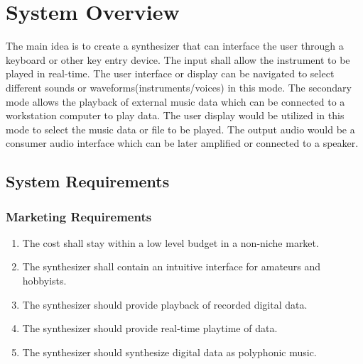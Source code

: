 \documentclass[bibtotocnumbered,abstract=on,paper=a4,fontsize=12pt,parskip=on,halfparskip=on]{scrartcl}		%
\begin{document}
\section{System Overview}
The main idea is to create a synthesizer that can interface the user through a keyboard or other key entry device. The input shall allow the instrument to be played in real-time. The user interface or display can be navigated to select different sounds or waveforms(instruments/voices) in this mode. The secondary mode allows the playback of external music data which can be connected to a workstation computer to play data. The user display would be utilized in this mode to select the music data or file to be played. The output audio would be a consumer audio interface which can be later amplified or connected to a speaker.

  \subsection{System Requirements}
    \subsubsection{Marketing Requirements}
      \begin{enumerate}
        \item The cost shall stay within a low level budget in a non-niche market.
        \item The synthesizer shall contain an intuitive interface for amateurs and hobbyists.
        \item The synthesizer should provide playback of recorded digital data.
        \item The synthesizer should provide real-time playtime of data.
        \item The synthesizer should synthesize digital data as polyphonic music.
      \end{enumerate}
\end{document}
